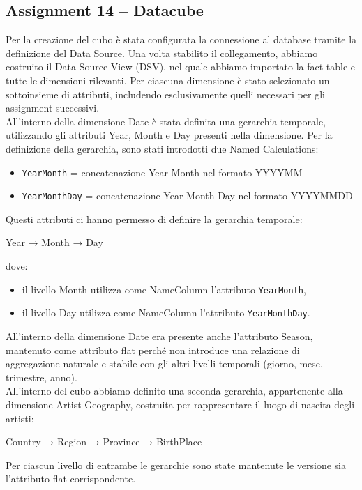 \subsection*{Assignment 14 -- Datacube}
Per la creazione del cubo è stata configurata la
connessione al database tramite la definizione del Data Source.
Una volta stabilito il collegamento, abbiamo costruito il Data Source
View (DSV), nel quale abbiamo importato la fact table e tutte le
dimensioni rilevanti.
Per ciascuna dimensione è stato selezionato un sottoinsieme di
attributi, includendo esclusivamente quelli necessari per gli
assignment successivi.\\

All'interno della dimensione Date è stata definita una gerarchia
temporale, utilizzando gli attributi Year, Month e Day presenti nella
dimensione.
Per la definizione della gerarchia, sono stati introdotti due Named
Calculations:
\begin{itemize}
    \item \texttt{YearMonth} = concatenazione Year-Month nel formato YYYYMM
    \item \texttt{YearMonthDay} = concatenazione Year-Month-Day nel formato YYYYMMDD
\end{itemize}

Questi attributi ci hanno permesso di definire la gerarchia temporale:
\begin{center}
    Year → Month → Day
\end{center}
dove:
\begin{itemize}
    \item il livello Month utilizza come NameColumn l'attributo \texttt{YearMonth},
    \item il livello Day utilizza come NameColumn l'attributo \texttt{YearMonthDay}.
\end{itemize}

All'interno della dimensione Date era presente anche l'attributo Season,
mantenuto come attributo flat perché non introduce una relazione
di aggregazione naturale e stabile con gli altri livelli temporali
(giorno, mese, trimestre, anno).\\

All'interno del cubo abbiamo definito una seconda gerarchia, appartenente
alla dimensione Artist Geography, costruita per rappresentare il luogo
di nascita degli artisti:
\begin{center}
    Country → Region → Province → BirthPlace
\end{center}
Per ciascun livello di entrambe le gerarchie sono state mantenute le
versione sia l'attributo flat corrispondente.\\

